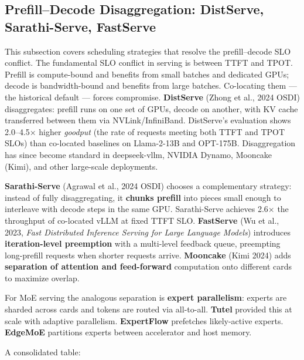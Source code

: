 \documentclass{article}
\begin{document}
\subsection{Prefill--Decode Disaggregation: DistServe, Sarathi-Serve, FastServe}\label{prefilldecode-disaggregation-distserve-sarathi-serve-fastserve}

This subsection covers scheduling strategies that resolve the prefill--decode SLO conflict. The fundamental SLO conflict in serving is between TTFT and TPOT. Prefill is compute-bound and benefits from small batches and dedicated GPUs; decode is bandwidth-bound and benefits from large batches. Co-locating them --- the historical default --- forces compromise. \textbf{DistServe} (Zhong et al., 2024 OSDI) disaggregates: prefill runs on one set of GPUs, decode on another, with KV cache transferred between them via NVLink/InfiniBand. DistServe's evaluation shows 2.0--4.5× higher \emph{goodput} (the rate of requests meeting both TTFT and TPOT SLOs) than co-located baselines on Llama-2-13B and OPT-175B. Disaggregation has since become standard in deepseek-vllm, NVIDIA Dynamo, Mooncake (Kimi), and other large-scale deployments.

\textbf{Sarathi-Serve} (Agrawal et al., 2024 OSDI) chooses a complementary strategy: instead of fully disaggregating, it \textbf{chunks prefill} into pieces small enough to interleave with decode steps in the same GPU. Sarathi-Serve achieves 2.6× the throughput of co-located vLLM at fixed TTFT SLO. \textbf{FastServe} (Wu et al., 2023, \emph{Fast Distributed Inference Serving for Large Language Models}) introduces \textbf{iteration-level preemption} with a multi-level feedback queue, preempting long-prefill requests when shorter requests arrive. \textbf{Mooncake} (Kimi 2024) adds \textbf{separation of attention and feed-forward} computation onto different cards to maximize overlap.

For MoE serving the analogous separation is \textbf{expert parallelism}: experts are sharded across cards and tokens are routed via all-to-all. \textbf{Tutel} \citep{hwang20232022} provided this at scale with adaptive parallelism. \textbf{ExpertFlow} \citep{he20242024} prefetches likely-active experts. \textbf{EdgeMoE} \citep{yi20232023} partitions experts between accelerator and host memory.

A consolidated table:
\end{document}
